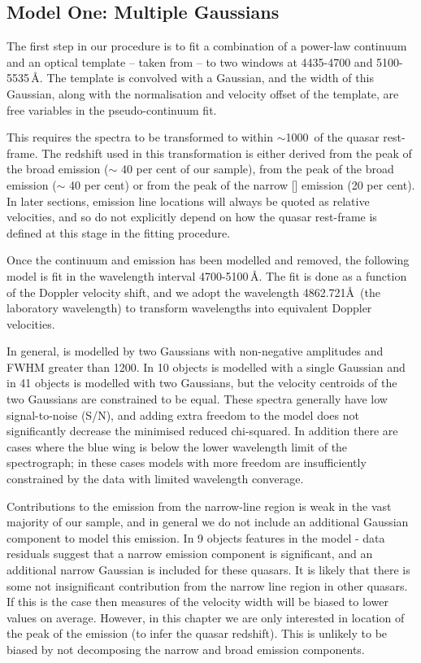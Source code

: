 \subsection{Model One: Multiple Gaussians}

The first step in our procedure is to fit a combination of a power-law continuum and an optical  template -- taken from \citet{boroson92} -- to two windows at 4435-4700 and 5100-5535\,\AA.
The  template is convolved with a Gaussian, and the width of this Gaussian, along with the normalisation and velocity offset of the  template, are free variables in the pseudo-continuum fit.

This requires the spectra to be transformed to within $\sim$1000\kms\, of the quasar rest-frame. 
The redshift used in this transformation is either derived from the peak of the broad \ha emission ($\sim$ 40 per cent of our sample), from the peak of the broad \hb emission ($\sim$ 40 per cent) or from the peak of the narrow [] emission (20 per cent).
In later sections, emission line locations will always be quoted as relative velocities, and so do not explicitly depend on how the quasar rest-frame is defined at this stage in the fitting procedure.  

Once the continuum and  emission has been modelled and removed, the following model is fit in the wavelength interval 4700-5100\,\AA.
The fit is done as a function of the Doppler velocity shift, and we adopt the wavelength 4862.721\AA\, (the laboratory \hb wavelength) to transform wavelengths into equivalent Doppler velocities.

In general, \hb is modelled by two Gaussians with non-negative amplitudes and FWHM greater than 1200\kms.
In 10 objects \hb is modelled with a single Gaussian and in 41 objects \hb is modelled with two Gaussians, but the velocity centroids of the two Gaussians are constrained to be equal. 
These spectra generally have low signal-to-noise (S/N), and adding extra freedom to the model does not significantly decrease the minimised reduced chi-squared.
In addition there are cases where the blue wing is below the lower wavelength limit of the spectrograph; in these cases models with more freedom are insufficiently constrained by the data with limited wavelength converage. 

Contributions to the \hb emission from the narrow-line region is weak in the vast majority of our sample, and in general we do not include an additional Gaussian component to model this emission. 
In 9 objects features in the model - data residuals suggest that a narrow emission component is significant, and an additional narrow Gaussian is included for these quasars. 
It is likely that there is some not insignificant contribution from the narrow line region in other quasars. 
If this is the case then measures of the \hb velocity width will be biased to lower values on average. 
However, in this chapter we are only interested in location of the peak of the \hb emission (to infer the quasar redshift). 
This is unlikely to be biased by not decomposing the narrow and broad emission components. 

